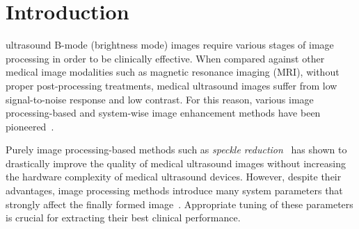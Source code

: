 
\section{Introduction}\label{section:introduction}
 ultrasound B-mode (brightness mode) images require various stages of image processing in order to be clinically effective.
When compared against other medical image modalities such as magnetic resonance imaging (MRI), without proper post-processing treatments, medical ultrasound images suffer from low signal-to-noise response and low contrast.
For this reason, various image processing-based and system-wise image enhancement methods have been pioneered~\cite{contrerasortiz_ultrasound_2012}.

Purely image processing-based methods such as \textit{speckle reduction}~\cite{finn_echocardiographic_2011, duarte-salazar_speckle_2020} has shown to drastically improve the quality of medical ultrasound images without increasing the hardware complexity of medical ultrasound devices. 
However, despite their advantages, image processing methods introduce many system parameters that strongly affect the finally formed image~\cite{duarte-salazar_speckle_2020}.
Appropriate tuning of these parameters is crucial for extracting their best clinical performance.%

